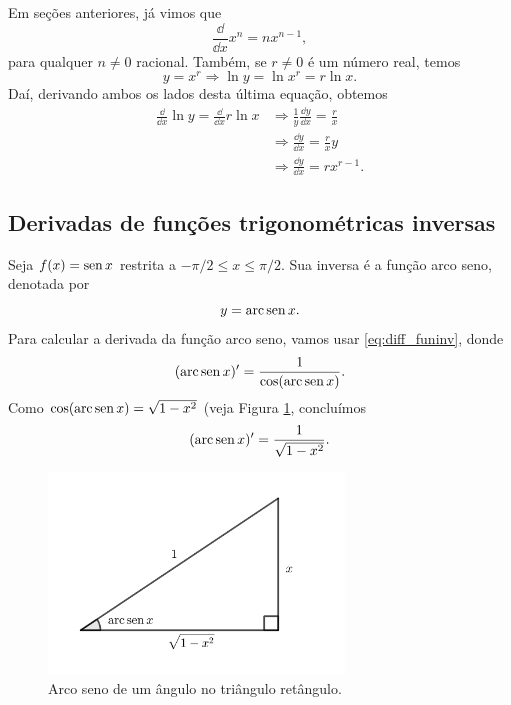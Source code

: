 \begin{ex}
  Em seções anteriores, já vimos que
  \begin{equation}
    \frac{\dd}{\dd x}x^n = nx^{n-1},
  \end{equation}
  para qualquer $n\neq 0$ racional. Também, se $r\neq 0$ é um número real, temos
  \begin{equation}
    y = x^r \Rightarrow \ln y = \ln x^r = r\ln x.
  \end{equation}
  Daí, derivando ambos os lados desta última equação, obtemos
  \begin{align}
    \frac{\dd}{\dd x} \ln y = \frac{\dd}{\dd x} r\ln x &\Rightarrow \frac{1}{y}\frac{\dd y}{\dd x} = \frac{r}{x}\\
                                                       &\Rightarrow \frac{\dd y}{\dd x} = \frac{r}{x}y\\
                                                       &\Rightarrow \frac{\dd y}{\dd x} = rx^{r-1}.
  \end{align}
\end{ex}

\subsection{Derivadas de funções trigonométricas inversas}

Seja $f(x) = \operatorname{sen} x$ restrita a $-\pi/2 \leq x \leq \pi/2$. Sua inversa é a função arco seno, denotada por
\begin{equation}
  y = \operatorname{arc}\operatorname{sen} x.
\end{equation}
Para calcular a derivada da função arco seno, vamos usar \eqref{eq:diff_funinv}, donde
\begin{equation}
  (\operatorname{arc}\operatorname{sen} x)' = \frac{1}{\cos(\operatorname{arc}\operatorname{sen} x)}.
\end{equation}
Como $\cos(\operatorname{arc}\operatorname{sen} x) = \sqrt{1-x^2}$ (veja Figura \ref{fig:diff_arc_sen}, concluímos
\begin{equation}
  (\operatorname{arc}\operatorname{sen} x)' = \frac{1}{\sqrt{1-x^2}}.
\end{equation}

\begin{figure}[H]
  \centering
  \includegraphics[width=0.7\textwidth]{./cap_deriv/dados/fig_diff_arc_sen/fig_diff_arc_sen}
  \caption{Arco seno de um ângulo no triângulo retângulo.}
  \label{fig:diff_arc_sen}
\end{figure}

